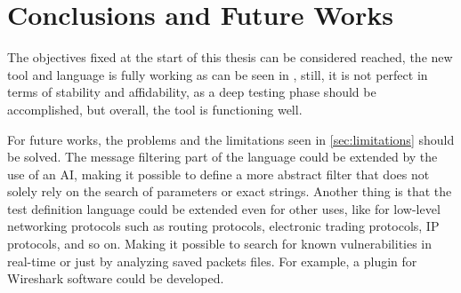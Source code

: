 \chapter{Conclusions and Future Works}
\label{chap:Conclusions}
The objectives fixed at the start of this thesis can be considered reached, the new tool and language is fully working as can be seen in \cite{sofia_zanrosso}, still, it is not perfect in terms of stability and affidability, as a deep testing phase should be accomplished, but overall, the tool is functioning well.

For future works, the problems and the limitations seen in \ref{sec:limitations} should be solved. The message filtering part of the language could be extended by the use of an AI, making it possible to define a more abstract filter that does not solely rely on the search of parameters or exact strings. Another thing is that the test definition language could be extended even for other uses, like for low-level networking protocols such as routing protocols, electronic trading protocols, IP protocols, and so on. Making it possible to search for known vulnerabilities in real-time or just by analyzing saved packets files. For example, a plugin for Wireshark software could be developed.
%




